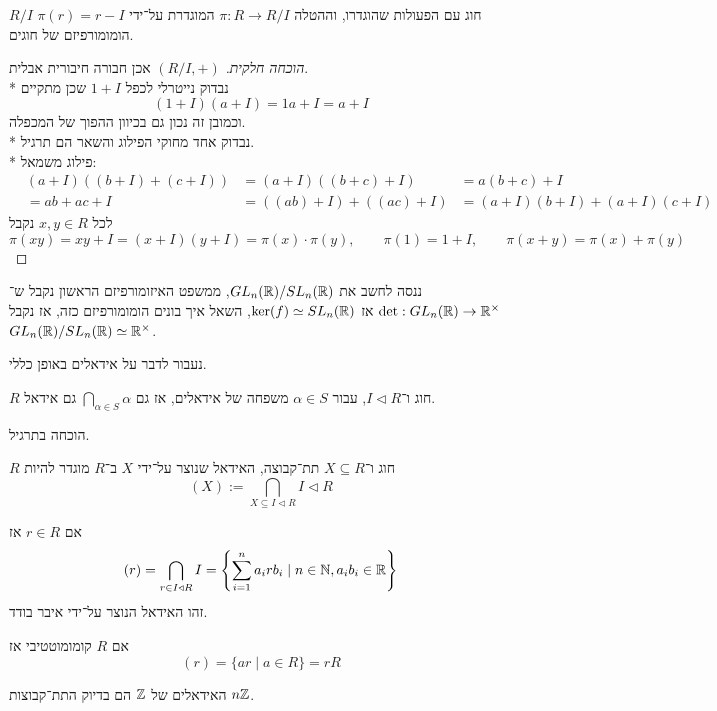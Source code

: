 \begin{proposition}
	$R/I$ חוג עם הפעולות שהוגדרו, וההטלה $\pi : R \to R / I$ המוגדרת על־ידי $\pi(r) = r - I$ הומומורפיזם של חוגים.
\end{proposition}
\begin{proof}[הוכחה חלקית]
	$(R/I, +)$ אכן חבורה חיבורית אבלית. \\*
	נבדוק נייטרלי לכפל $1 + I$ שכן מתקיים
	\[
		(1 + I)(a + I) = 1a + I = a + I
	\]
	וכמובן זה נכון גם בכיוון ההפוך של המכפלה. \\*
	נבדוק אחד מחוקי הפילוג והשאר הם תרגיל. \\*
	פילוג משמאל:
	\begin{align*}
		& (a + I)((b + I) + (c + I))
		& = (a + I)((b + c) + I)
		& = a(b + c) + I \\
		& = ab + ac + I
		& = ((ab) + I) + ((ac) + I)
		& = (a + I)(b + I) + (a + I)(c + I)
	\end{align*}
	לכל $x, y \in R$ נקבל
	\[
		\pi(xy) = xy + I = (x + I)(y + I) = \pi(x) \cdot \pi(y),
		\qquad
		\pi(1) = 1 + I,
		\qquad
		\pi(x + y) = \pi(x) + \pi(y)
	\]
\end{proof}
\begin{example}
	ננסה לחשב את $GL_n(\mathbb{R}) / SL_n(\mathbb{R})$, ממשפט האיזומורפיזם הראשון נקבל ש־$\det : GL_n(\mathbb{R}) \to \mathbb{R}^\times$ אז $\ker(f) \simeq SL_n(\mathbb{R})$, השאל איך בונים הומומורפיזם כזה, אז נקבל $GL_n(\mathbb{R}) / SL_n(\mathbb{R}) \simeq \mathbb{R}^\times$.
\end{example}
נעבור לדבר על אידאלים באופן כללי.
\begin{lemma}
	$R$ חוג ו־$I \triangleleft R$, עבור $\alpha \in S$ משפחה של אידאלים, אז גם $\bigcap_{\alpha \in S} \alpha$ גם אידאל.
\end{lemma}
הוכחה בתרגיל.
\begin{definition}
	$R$ חוג ו־$X \subseteq R$ תת־קבוצה, האידאל שנוצר על־ידי $X$ ב־$R$ מוגדר להיות
	\[
		(X) := \bigcap_{X \subseteq I \triangleleft R} I \triangleleft R
	\]
\end{definition}
\begin{example}
	אם $r \in R$ אז
	\[
		(r) = \bigcap_{r \in I \triangleleft R} I
		= \left\{ \sum_{i = 1}^{n} a_i r b_i \mid n \in \mathbb{N}, a_i b_i \in \mathbb{R} \right\}
	\]
	זהו האידאל הנוצר על־ידי איבר בודד.
\end{example}
\begin{remark}
	אם $R$ קומומוטטיבי אז
	\[
		(r) = \{ a r \mid a \in R \} = rR
	\]
\end{remark}
\begin{proposition}
	האידאלים של $\mathbb{Z}$ הם בדיוק התת־קבוצות $n \mathbb{Z}$.
\end{proposition}
